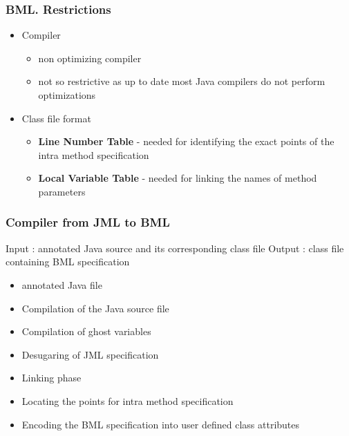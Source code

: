 \documentclass{beamer}
\begin{document}
  \begin{frame}[shrink]\frametitle{BML. Restrictions}
   \begin{itemize} 
      \item Compiler 
	   \begin{itemize} 
               \item non optimizing compiler
	       \item not so restrictive as up to date most Java compilers 
		     do not perform optimizations
	   \end{itemize}
      \item Class file format
	 \begin{itemize} 
               \item \textbf{Line Number Table} - needed for identifying the exact points of the 
		 intra method specification
		 \item \textbf{Local Variable Table}  - needed for linking the names of method parameters
         \end{itemize}
   \end{itemize}
 \end{frame}


\begin{frame}[shrink]\frametitle{Compiler from JML to BML}
     
   Input : annotated  Java source and its corresponding class file
   Output : class file containing BML specification 
     \begin{itemize}
         \item annotated Java file 
          \item Compilation of the Java source file 
	    \item Compilation of ghost variables
	      \item Desugaring of JML specification
		\item Linking phase
		  \item Locating the points for intra method specification 
		    \item Encoding the BML specification into user defined class attributes
       \end{itemize}
\end{frame}
\end{document}
